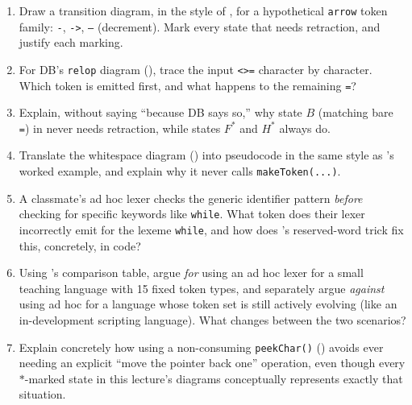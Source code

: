 \documentclass[full-course-notes.tex]{subfiles}
\begin{document}
\begin{enrichment}
\begin{enumerate}
  \item Draw a transition diagram, in the style of , for a
  hypothetical \texttt{arrow} token family: \texttt{-}, \texttt{->}, \texttt{--} (decrement).
  Mark every state that needs retraction, and justify each marking.
  \item For DB's \texttt{relop} diagram (), trace the input
  \texttt{<>=} character by character. Which token is emitted first, and what happens to the
  remaining \texttt{=}?
  \item Explain, without saying ``because DB says so,'' why state $B$ (matching bare \texttt{=})
  in  never needs retraction, while states $F^{*}$ and $H^{*}$ always
  do.
  \item Translate the whitespace diagram () into pseudocode in
  the same style as 's worked example, and explain why it never calls
  \texttt{makeToken(...)}.
  \item A classmate's ad hoc lexer checks the generic identifier pattern \emph{before} checking
  for specific keywords like \texttt{while}. What token does their lexer incorrectly emit for
  the lexeme \texttt{while}, and how does 's reserved-word trick fix
  this, concretely, in code?
  \item Using 's comparison table, argue \emph{for} using an ad hoc
  lexer for a small teaching language with 15 fixed token types, and separately argue
  \emph{against} using ad hoc for a language whose token set is still actively evolving (like an
  in-development scripting language). What changes between the two scenarios?
  \item Explain concretely how using a non-consuming \texttt{peekChar()} ()
  avoids ever needing an explicit ``move the pointer back one'' operation, even though every
  $*$-marked state in this lecture's diagrams conceptually represents exactly that situation.
\end{enumerate}
\end{enrichment}
\end{document}
